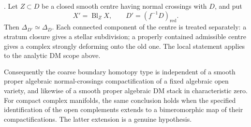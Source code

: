\begin{theorem}
\label{P4c1}
. Let $Z\subset D$ be a closed smooth centre having normal crossings with $D$, and put
\[
 X'=\operatorname{Bl}_Z X,\qquad D'=(f^{-1}D)_{\mathrm{red}}.
\]
Then $\Delta_{D'}\simeq\Delta_D$. Each connected component of the centre is treated separately: a stratum closure gives a stellar subdivision; a properly contained admissible centre gives a complex strongly deforming onto the old one. The local statement applies to the analytic DM scope above.

Consequently the coarse boundary homotopy type is independent of a smooth proper algebraic normal-crossings compactification of a fixed algebraic open variety, and likewise of a smooth proper algebraic DM stack in characteristic zero. For compact complex manifolds, the same conclusion holds when the specified identification of the open complements extends to a bimeromorphic map of their compactifications. The latter extension is a genuine hypothesis.
\end{theorem}

